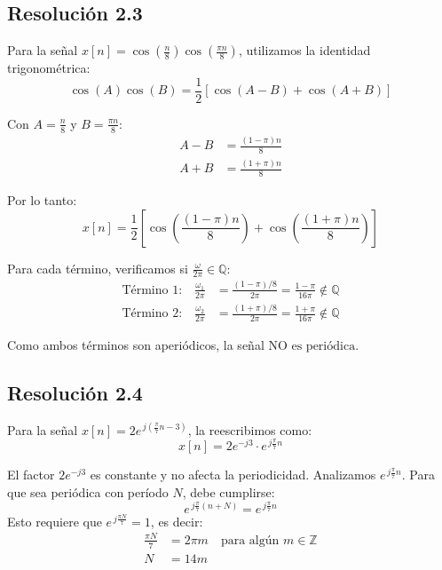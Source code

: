 \documentclass[
  11pt,
  letterpaper,
   addpoints,
  ]{exam}
\begin{document}
\begin{questions}
\begin{solution}
\subsection*{Resolución 2.3}

Para la señal $x[n] = \cos\!\left(\tfrac{n}{8}\right)\cos\!\left(\tfrac{\pi n}{8}\right)$, utilizamos la identidad trigonométrica:
\begin{equation}
\cos(A)\cos(B) = \frac{1}{2}[\cos(A-B) + \cos(A+B)]
\end{equation}

Con $A = \frac{n}{8}$ y $B = \frac{\pi n}{8}$:
\begin{align}
A - B &= \frac{(1-\pi)n}{8} \\
A + B &= \frac{(1+\pi)n}{8}
\end{align}

Por lo tanto:
\begin{equation}
x[n] = \frac{1}{2}\left[\cos\!\left(\frac{(1-\pi)n}{8}\right) + \cos\!\left(\frac{(1+\pi)n}{8}\right)\right]
\end{equation}

Para cada término, verificamos si $\frac{\omega}{2\pi} \in \mathbb{Q}$:
\begin{align}
\text{Término 1:} \quad \frac{\omega_1}{2\pi} &= \frac{(1-\pi)/8}{2\pi} = \frac{1-\pi}{16\pi} \notin \mathbb{Q} \\
\text{Término 2:} \quad \frac{\omega_2}{2\pi} &= \frac{(1+\pi)/8}{2\pi} = \frac{1+\pi}{16\pi} \notin \mathbb{Q}
\end{align}

Como ambos términos son aperiódicos, la señal $\boxed{\text{NO es periódica}}$.

\subsection*{Resolución 2.4}

Para la señal $x[n] = 2e^{\,j(\frac{\pi}{7}n-3)}$, la reescribimos como:
\begin{equation}
x[n] = 2e^{-j3} \cdot e^{\,j\frac{\pi}{7}n}
\end{equation}

El factor $2e^{-j3}$ es constante y no afecta la periodicidad. Analizamos $e^{\,j\frac{\pi}{7}n}$. Para que sea periódica con período $N$, debe cumplirse:
\begin{equation}
e^{\,j\frac{\pi}{7}(n+N)} = e^{\,j\frac{\pi}{7}n}
\end{equation}
Esto requiere que $e^{\,j\frac{\pi N}{7}} = 1$, es decir:
\begin{align}
\frac{\pi N}{7} &= 2\pi m \quad \text{para algún } m \in \mathbb{Z} \\
N &= 14m
\end{align}


\end{solution}
\end{questions}
\end{document}
